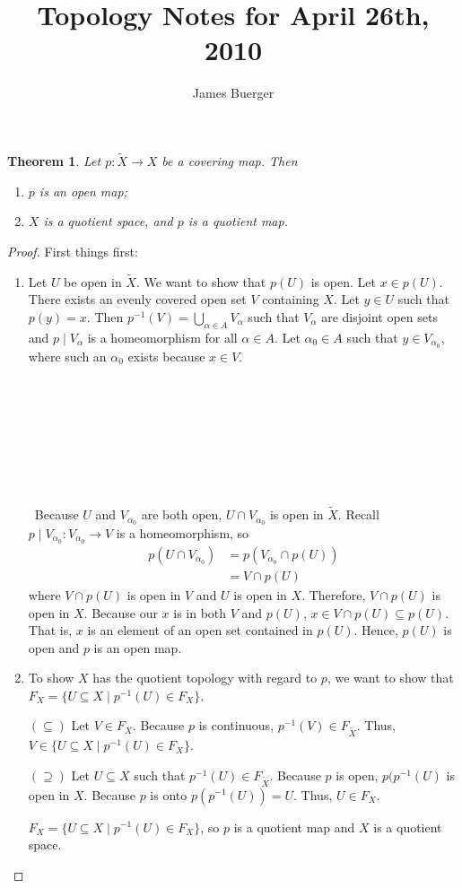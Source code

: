 \documentclass[11pt,reqno]{article}
\newtheorem{Theorem}{Theorem}
\theoremstyle{definition}
\begin{document}
\author{James Buerger}
\date{}

\title{Topology Notes for  April 26th, 2010}
\maketitle

\begin{Theorem}  Let $p:\widetilde{X}\rightarrow X$ be a covering map.  Then
\begin{enumerate}
\item  $p$ is an open map;
\item $X$ is a quotient space, and $p$ is a quotient map.
\end{enumerate}
\end{Theorem}

\begin{proof} First things first:
\begin{enumerate}
\item Let $U$ be open in $\widetilde{X}$.  We want to show that $p(U)$ is open.  Let $x \in p(U).$  There exists an evenly covered open set $V$ containing $X$.  Let $y \in U$ such that $p(y)=x.$  Then $p^{-1}(V)=\displaystyle\bigcup_{\alpha \in A}V_{\alpha}$ such that $V_{\alpha}$ are disjoint open sets and $p \mid V_{\alpha}$ is a homeomorphism for all $\alpha \in A$.  Let $\alpha_0 \in A$ such that $y \in V_{\alpha_0}$, where such an $\alpha_0$ exists because $x \in V$.
\\\\\\\\\\\\\\\\\\\
Because $U$ and $V_{\alpha_0}$ are both open, $U\cap V_{\alpha_0}$ is open in $\widetilde{X}$. Recall $p\mid V_{\alpha_0}:V_{\alpha_0}\rightarrow V$ is a homeomorphism, so 
\begin{align*}
p(U\cap V_{\alpha_0})&=p\left(V_{\alpha_0}\cap p(U)\right)\\
&=V\cap p(U)
\end{align*}
where $V\cap p(U)$ is open in $V$ and $U$ is open in $X$. Therefore, $V\cap p(U)$ is open in $X$. Because our $x$ is in both $V$ and $p(U)$, $x\in V\cap p(U)\subseteq p(U)$. That is, $x$ is an element of an open set contained in $p(U)$. Hence, $p(U)$ is open and $p$ is an open map.
\item To show $X$ has the quotient topology with regard to $p$, we want to show that $F_X = \{U\subseteq X \mid p^{-1}(U)\in F_X\}$.

$(\subseteq)$ Let $V\in F_X$. Because $p$ is continuous, $p^{-1}(V)\in F_{\widetilde{X}}$. Thus, $V\in \{U\subseteq X \mid p^{-1}(U)\in F_X\}$.

$(\supseteq)$ Let $U\subseteq X$ such that $p^{-1}(U)\in F_{\widetilde{X}}$. Because $p$ is open, $p(p^{-1}(U)$ is open in $X$. Because $p$ is onto $p(p^{-1}(U))=U$. Thus, $U\in F_X$.

$F_X = \{U\subseteq X \mid p^{-1}(U)\in F_X\}$, so $p$ is a quotient map and $X$ is a quotient space. \end{enumerate} \end{proof}
\end{document}
